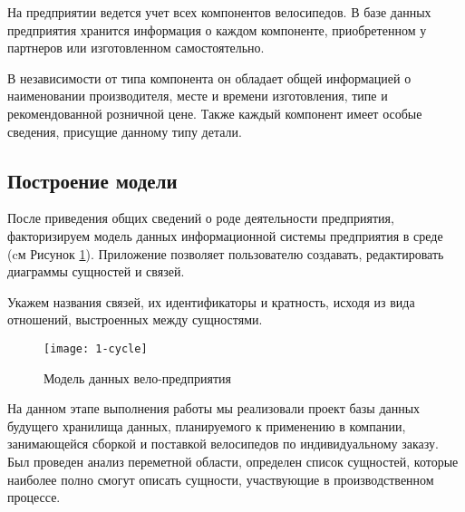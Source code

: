На предприятии ведется учет всех компонентов велосипедов.
В базе данных предприятия хранится информация о каждом компоненте, приобретенном у партнеров или изготовленном самостоятельно.

В независимости от типа компонента он обладает общей информацией о наименовании производителя, месте и времени изготовления, типе и рекомендованной розничной цене. 
Также каждый компонент имеет особые сведения, присущие данному типу детали.

\subsection{Построение модели}
После приведения общих сведений о роде деятельности предприятия, факторизируем модель данных информационной системы предприятия в среде \erassistant (cм Рисунок \ref{fig:1-cycle}). Приложение \erassistant позволяет пользователю создавать, редактировать диаграммы сущностей и связей.

Укажем названия связей, их идентификаторы и кратность, исходя из вида отношений, выстроенных между сущностями.
\begin{figure}[h!]
	\centering
	\texttt{[image: 1-cycle]}
	\caption{Модель данных вело-предприятия}
	\label{fig:1-cycle}
\end{figure}



На данном этапе выполнения работы мы реализовали проект базы данных будущего хранилища данных, планируемого к применению в компании, занимающейся сборкой и поставкой велосипедов по индивидуальному заказу. Был проведен анализ переметной области, определен список сущностей, которые наиболее полно смогут описать сущности, участвующие в производственном процессе.
